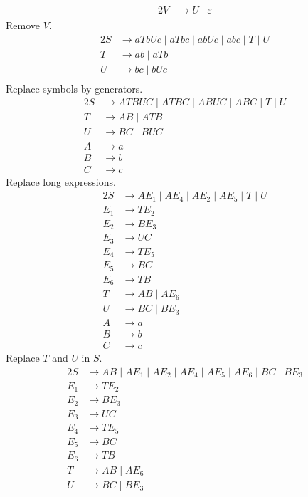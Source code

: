 \documentclass[docid=PA09]{tcom_PA}
\begin{document}
{\begin{alignat*}{2}
	V &\rightarrow U\mid \varepsilon
\end{alignat*}
Remove $V$.
\begin{alignat*}{2}
	S &\rightarrow aTbUc\mid aTbc\mid abUc\mid abc\mid T\mid U\\
	T &\rightarrow ab\mid aTb\\
	U &\rightarrow bc\mid bUc\\
\end{alignat*}
Replace symbols by generators.
\begin{alignat*}{2}
	S &\rightarrow ATBUC\mid ATBC\mid ABUC\mid ABC\mid T\mid U\\
	T &\rightarrow AB\mid ATB\\
	U &\rightarrow BC\mid BUC\\
	A &\rightarrow a\\
	B &\rightarrow b\\
	C &\rightarrow c
\end{alignat*}
Replace long expressions.
\begin{alignat*}{2}
	S   &\rightarrow AE_1\mid AE_4\mid AE_2\mid AE_5\mid T\mid U\\
	E_1 &\rightarrow TE_2\\
	E_2 &\rightarrow BE_3\\
	E_3 &\rightarrow UC\\
	E_4 &\rightarrow TE_5\\
	E_5 &\rightarrow BC\\
	E_6 &\rightarrow TB\\
	T   &\rightarrow AB\mid AE_6\\
	U   &\rightarrow BC\mid BE_3\\
	A   &\rightarrow a\\
	B   &\rightarrow b\\
	C   &\rightarrow c
\end{alignat*}
Replace $T$ and $U$ in $S$.
\begin{alignat*}{2}
	S   &\rightarrow AB\mid AE_1\mid AE_2\mid AE_4\mid AE_5\mid AE_6\mid BC\mid BE_3\\
	E_1 &\rightarrow TE_2\\
	E_2 &\rightarrow BE_3\\
	E_3 &\rightarrow UC\\
	E_4 &\rightarrow TE_5\\
	E_5 &\rightarrow BC\\
	E_6 &\rightarrow TB\\
	T   &\rightarrow AB\mid AE_6\\
	U   &\rightarrow BC\mid BE_3\\

\end{alignat*}}
\end{document}
